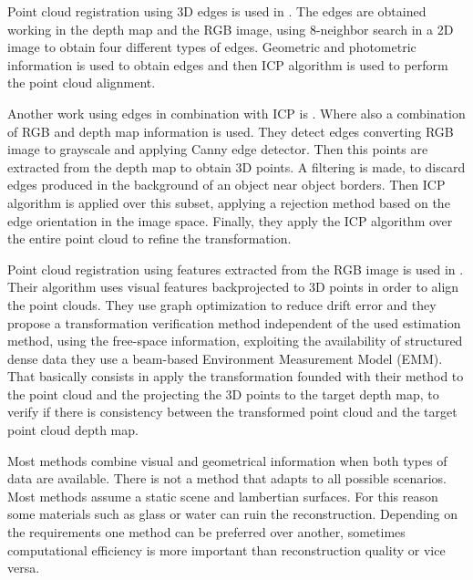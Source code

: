 Point cloud registration using 3D edges is used in \cite{choi13}. The edges are obtained working in the depth map and the RGB image, 
using 8-neighbor search in a 2D image to obtain four different types of edges. Geometric and photometric information is used to 
obtain edges and then ICP algorithm is used to perform the point cloud alignment.  


Another work using edges in combination with ICP is \cite{dryan2012}. Where also a combination of RGB and depth map information is 
used. They detect edges converting RGB image to grayscale and applying Canny edge detector. Then this points are extracted from 
the depth map to obtain 3D points. A filtering is made, to discard edges produced in the background of an object near object borders. 
Then ICP algorithm is applied over this subset, applying a rejection method based on the edge orientation in the image space. Finally, 
they apply the ICP algorithm over the entire point cloud to refine the transformation.

Point cloud registration using features extracted from the RGB image is used in \cite{endres13}. Their algorithm uses visual features 
backprojected to 3D points in order to align the point clouds. They use graph optimization to reduce drift error and they propose a 
transformation verification method independent of the used estimation method, using the free-space information,
exploiting the availability of structured dense data they use a beam-based Environment Measurement Model (EMM). That basically consists 
in apply the transformation founded with their method to the point cloud and the projecting the 3D points to the target depth map, 
to verify if there is consistency 
between the transformed point cloud and the target point cloud depth map.


Most methods combine visual and geometrical information when both types of data are available. There is not a method 
that adapts to all possible scenarios. Most methods assume a static scene and lambertian 
surfaces. For this reason some materials such as glass or water can ruin the reconstruction. 
Depending on the requirements one method can be preferred 
over another, sometimes computational efficiency is more important than reconstruction quality or vice versa.











